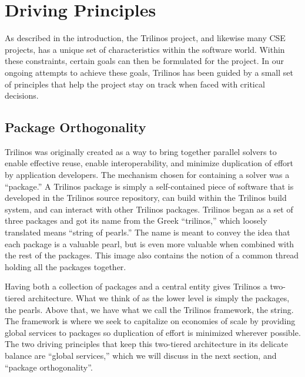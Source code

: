 \documentclass[12pt,relax]{article}
\begin{document}
\clearpage


\section{Driving Principles}
\label{Section:Driving Principles}

As described in the introduction, the Trilinos project, and likewise many CSE
projects, has a unique set of characteristics within the software world.
Within these constraints, certain goals can then be formulated for the project.
In our ongoing attempts to achieve these goals, Trilinos has been guided by a
small set of principles that help the project stay on track when faced with 
critical decisions.

\subsection{Package Orthogonality}

Trilinos was originally created as a way to bring together parallel solvers
to enable effective reuse, enable interoperability, and minimize duplication of
effort by application developers.  The mechanism chosen for containing a solver
was a ``package.''  A Trilinos package is simply a self-contained piece of
software that is developed in the Trilinos source repository, can build within
the Trilinos build system, and can interact with other Trilinos packages.
Trilinos began as a set of three packages and got its name from the Greek 
``trilinos,'' which loosely translated means ``string of pearls.''  The name is
meant to convey the idea that each package is a valuable pearl, but is even
more valuable when combined with the rest of the packages.  This image also
contains the notion of a common thread holding all the packages together.

Having both a collection of packages and a central entity gives Trilinos a
two-tiered architecture.  What we think of as the lower level is simply the
packages, the pearls.  Above that, we have what we call the Trilinos framework,
the string.  The framework is where we seek to capitalize on economies of scale
by providing global services to packages so duplication of effort is minimized
wherever possible.  The two driving principles that keep this two-tiered
architecture in its delicate balance are ``global services,'' which we will
discuss in the next section, and ``package orthogonality''.
\end{document}
